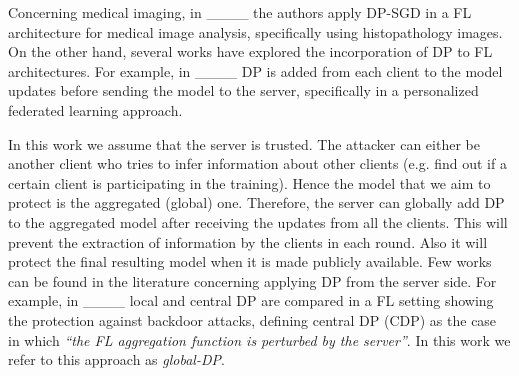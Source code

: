 Concerning medical imaging, in ____ the authors apply DP-SGD in a FL architecture for medical image analysis, specifically using histopathology images. On the other hand, several works have explored the incorporation of DP to FL architectures. For example, in ____ DP is added from each client to the model updates before sending the model to the server, specifically in a personalized federated learning approach.

In this work we assume that the server is trusted. The attacker can either be another client who tries to infer information about other clients (e.g. find out if a certain client is participating in the training). Hence the model that we aim to protect is the aggregated (global) one. Therefore, the server can globally add DP to the aggregated model after receiving the updates from all the clients. This will prevent the extraction of information by the clients in each round. Also it will protect the final resulting model when it is made publicly available.
Few works can be found in the literature concerning applying DP from the server side. For example, in ____ local and central DP are compared in a FL setting showing the protection against backdoor attacks, defining central DP (CDP) as the case in which \textit{``the FL aggregation function is perturbed by the server''}. In this work we refer to this approach as \emph{global-DP}.